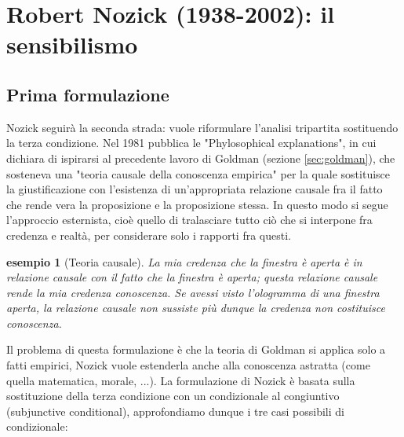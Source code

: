 \documentclass[10pt,a4paper]{article}
\newtheorem{esempio}{esempio}
\begin{document}
\section{Robert Nozick (1938-2002): il sensibilismo}
\subsection{Prima formulazione}
Nozick seguirà la seconda strada: vuole riformulare l'analisi tripartita sostituendo la terza condizione. Nel 1981 pubblica le "Phylosophical explanations", in cui dichiara di ispirarsi al precedente lavoro di Goldman (sezione \ref{sec:goldman}), che sosteneva una "teoria causale della conoscenza empirica" per la quale sostituisce la giustificazione con l'esistenza di un'appropriata relazione causale fra il fatto che rende vera la proposizione e la proposizione stessa. In questo modo si segue l'approccio esternista, cioè quello di tralasciare tutto ciò che si interpone fra credenza e realtà, per considerare solo i rapporti fra questi.
\begin{esempio}[Teoria causale]
	La mia credenza che la finestra è aperta è in relazione causale con il fatto che la finestra è aperta; questa relazione causale rende la mia credenza conoscenza. Se avessi visto l'ologramma di una finestra aperta, la relazione causale non sussiste più dunque la credenza non costituisce conoscenza.
\end{esempio}
Il problema di questa formulazione è che la teoria di Goldman si applica solo a fatti empirici, Nozick vuole estenderla anche alla conoscenza astratta (come quella matematica, morale, ...). La formulazione di Nozick è basata sulla sostituzione della terza condizione con un condizionale al congiuntivo (subjunctive conditional), approfondiamo dunque i tre casi possibili di condizionale:
\end{document}

